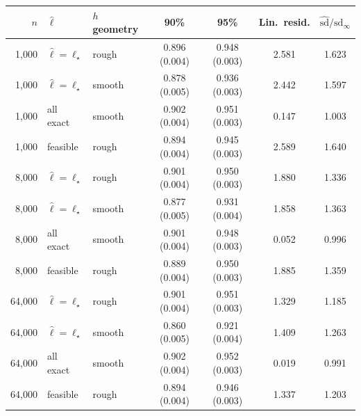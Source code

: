 \begin{tabular}{rllcccc}
\toprule
$n$ & $\hat\ell$ & $h$ geometry & 90\% & 95\% & Lin.\ resid. & $\hat{\mathrm{sd}}/\mathrm{sd}_\infty$ \\
\midrule
1,000 & $\hat\ell=\ell_\star$ & rough & 0.896 (0.004) & 0.948 (0.003) & 2.581 & 1.623 \\
1,000 & $\hat\ell=\ell_\star$ & smooth & 0.878 (0.005) & 0.936 (0.003) & 2.442 & 1.597 \\
1,000 & all exact & smooth & 0.902 (0.004) & 0.951 (0.003) & 0.147 & 1.003 \\
1,000 & feasible & rough & 0.894 (0.004) & 0.945 (0.003) & 2.589 & 1.640 \\
8,000 & $\hat\ell=\ell_\star$ & rough & 0.901 (0.004) & 0.950 (0.003) & 1.880 & 1.336 \\
8,000 & $\hat\ell=\ell_\star$ & smooth & 0.877 (0.005) & 0.931 (0.004) & 1.858 & 1.363 \\
8,000 & all exact & smooth & 0.901 (0.004) & 0.948 (0.003) & 0.052 & 0.996 \\
8,000 & feasible & rough & 0.889 (0.004) & 0.950 (0.003) & 1.885 & 1.359 \\
64,000 & $\hat\ell=\ell_\star$ & rough & 0.901 (0.004) & 0.951 (0.003) & 1.329 & 1.185 \\
64,000 & $\hat\ell=\ell_\star$ & smooth & 0.860 (0.005) & 0.921 (0.004) & 1.409 & 1.263 \\
64,000 & all exact & smooth & 0.902 (0.004) & 0.952 (0.003) & 0.019 & 0.991 \\
64,000 & feasible & rough & 0.894 (0.004) & 0.946 (0.003) & 1.337 & 1.203 \\
\bottomrule
\end{tabular}
